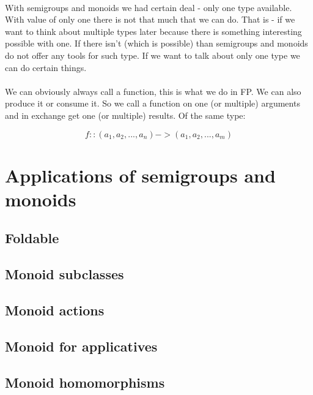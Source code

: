 \documentclass{article}
\begin{document}
    \paragraph{}
    With semigroups and monoids we had certain deal - only one type available. With value of only one there is not that much that we can do. That is - if we want to think about multiple types later because there is something interesting possible with one. If there isn't (which is possible) than semigroups and monoids do not offer any tools for such type. If we want to talk about only one type we can do certain things.
    \paragraph{}
    We can obviously always call a function, this is what we do in FP. We can also produce it or consume it. So we call a function on one (or multiple) arguments and in exchange get one (or multiple) results. Of the same type:

    \begin{equation}
        f :: (a_1, a_2, ..., a_n) -> (a_1, a_2, ..., a_m)
    \end{equation}

    \section{Applications of semigroups and monoids}

    \subsection{Foldable}

    \subsection{Monoid subclasses}

    \subsection{Monoid actions}

    \subsection{Monoid for applicatives}

    \subsection{Monoid homomorphisms}
\end{document}
